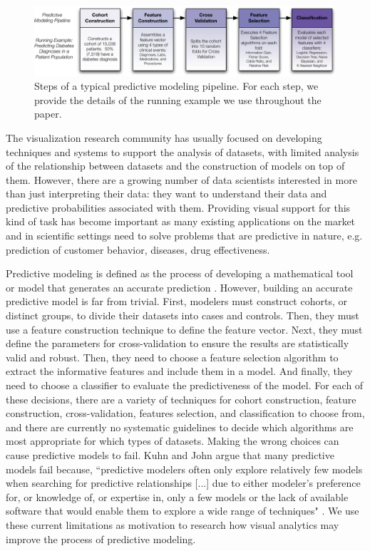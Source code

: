 \begin{figure}[ht]
\centering
\includegraphics[width=\linewidth]{infuse/pipeline}
\caption{Steps of a typical predictive modeling pipeline.  For each step, we provide the details of the running example we use throughout the paper.
}
\label{fig:pipeline}
\end{figure}

The visualization research community has usually focused on developing techniques and systems to support the analysis of datasets, with limited analysis of the relationship between datasets and the construction of models on top of them. However, there are a growing number of data scientists interested in more than just interpreting their data: they want to understand their data and predictive probabilities associated with them. Providing visual support for this kind of task has become important as many existing applications on the market and in scientific settings need to solve problems that are predictive in nature, e.g. prediction of customer behavior, diseases, drug effectiveness.

Predictive modeling is defined as the process of developing a mathematical tool or model that generates an accurate prediction \cite{kuhn2013applied}. However, building an accurate predictive model is far from trivial. First, modelers must construct cohorts, or distinct groups, to divide their datasets into cases and controls. Then, they must use a feature construction technique to define the feature vector. Next, they must define the parameters for cross-validation to ensure the results are statistically valid and robust. Then, they need to choose a feature selection algorithm to extract the informative features and include them in a model. And finally, they need to choose a classifier to evaluate the predictiveness of the model. For each of these decisions, there are a variety of techniques for cohort construction, feature construction, cross-validation, features selection, and classification to choose from, and there are currently no systematic guidelines to decide which algorithms are most appropriate for which types of datasets. Making the wrong choices can cause predictive models to fail. Kuhn and John argue that many predictive models fail because, ``predictive modelers often only explore relatively few models when searching for predictive relationships [...] due to either modeler's preference for, or knowledge of, or expertise in, only a few models or the lack of available software that would enable them to explore a wide range of techniques" \cite{kuhn2013applied}. We use these current limitations as motivation to research how visual analytics may improve the process of predictive modeling.

